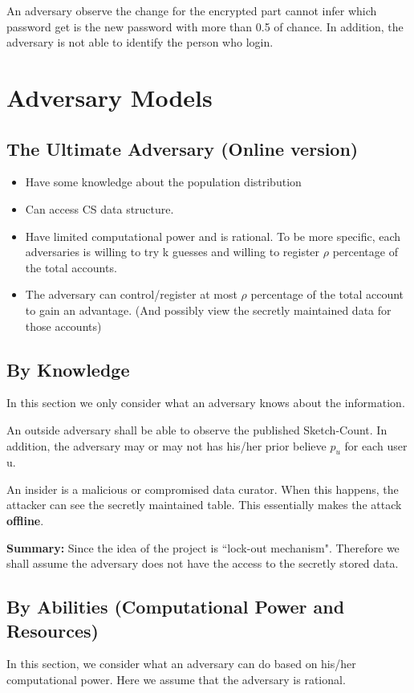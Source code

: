 \documentclass[]{article}
\begin{document}
An adversary observe the change for the encrypted part cannot infer which password get is the new password with more than 0.5 of chance. In addition, the adversary is not able to identify the person who login.
\section{Adversary Models}
\subsection{The Ultimate Adversary (Online version)}
\begin{itemize}
	\item Have some knowledge about the population distribution
	\item Can access CS data structure.
	\item Have limited computational power and is rational. To be more specific, each adversaries is willing to try k guesses and willing to register $\rho$ percentage of the total accounts.
	\item The adversary can control/register at most $\rho$ percentage of the total account to gain an advantage. (And possibly view the secretly maintained data for those accounts)
	
\end{itemize}
\subsection{By Knowledge}
In this section we only consider what an adversary knows about the information.

An outside adversary shall be able to observe the published Sketch-Count. In addition,  the adversary may or may not has his/her prior believe $p_u$ for each user u.

An insider is a malicious or compromised data curator. When this happens, the attacker can see the secretly maintained table. This essentially makes the attack \textbf{offline}. 


\textbf{Summary:} Since the idea of the project is ``lock-out mechanism". Therefore we shall assume the adversary does not have the access to the secretly stored data.
\subsection{By Abilities (Computational Power and Resources)}
In this section, we consider what an adversary can do based on his/her computational power. Here we assume that the adversary is rational. 
\end{document}
